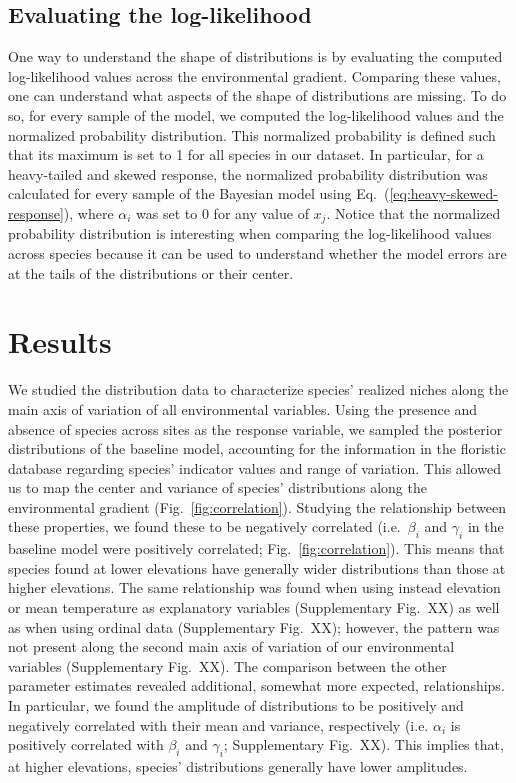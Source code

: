 \documentclass[11pt, a4paper]{article}
\begin{document}
\subsection*{Evaluating the log-likelihood}
One way to understand the shape of distributions is by evaluating the computed log-likelihood values across the environmental gradient. Comparing these values, one can understand what aspects of the shape of distributions are missing. To do so, for every sample of the model, we computed the log-likelihood values and the normalized probability distribution. This normalized probability is defined such that its maximum is set to 1 for all species in our dataset. In particular, for a heavy-tailed and skewed response, the normalized probability distribution was calculated for every sample of the Bayesian model using Eq.~(\ref{eq:heavy-skewed-response}), where $\alpha_i$ was set to 0 for any value of $x_{j}$. Notice that the normalized probability distribution is interesting when comparing the log-likelihood values across species because it can be used to understand whether the model errors are at the tails of the distributions or their center. 

\section*{Results}
We studied the distribution data to characterize species' realized niches along the main axis of variation of all environmental variables. Using the presence and absence of species across sites as the response variable, we sampled the posterior distributions of the baseline model, accounting for the information in the floristic database regarding species' indicator values and range of variation. This allowed us to map the center and variance of species' distributions along the environmental gradient (Fig.~\ref{fig:correlation}).  Studying the relationship between these properties, we found these to be negatively correlated (i.e.~$\beta_{i}$ and $\gamma_{i}$ in the baseline model were positively correlated; Fig.~\ref{fig:correlation}). This means that species found at lower elevations have generally wider distributions than those at higher elevations. The same relationship was found when using instead elevation or mean temperature as explanatory variables (Supplementary Fig.~XX) as well as when using ordinal data (Supplementary Fig.~XX); however, the pattern was not present along the second main axis of variation of our environmental variables (Supplementary Fig.~XX). The comparison between the other parameter estimates revealed additional, somewhat more expected, relationships. In particular, we found the amplitude of distributions to be positively and negatively correlated with their mean and variance, respectively (i.e. $\alpha_{i}$ is positively correlated with $\beta_{i}$ and $\gamma_{i}$; Supplementary Fig.~XX). This implies that, at higher elevations, species' distributions generally have lower amplitudes.
\end{document}
